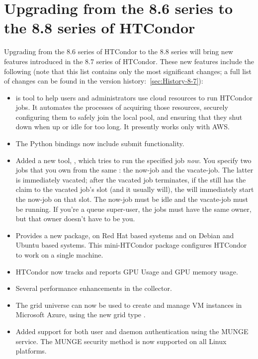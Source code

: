 \section{Upgrading from the 8.6 series to the 8.8 series of HTCondor}\label{sec:to-8.8}

Upgrading from the 8.6 series of HTCondor to the 8.8 series
will bring new features introduced in the 8.7 series of HTCondor.
These new features include the following (note that this list contains
only the most significant changes; a full list of changes can be
found in the version history:~\ref{sec:History-8-7}):

\begin{itemize}

\item {} is tool to help users and administrators use cloud
resources to run HTCondor jobs.
It automates the processes of acquiring those resources, securely configuring
them to safely join the local pool, and ensuring that they shut down when up or
idle for too long.
It presently works only with AWS.

\item The Python bindings now include submit functionality.

\item Added a new tool, , which tries to run the specified job
\emph{now}.  You specify two jobs that you own from the same : the
now-job and the vacate-job.  The latter is immediately vacated; after the
vacated job terminates, if the  still has the claim to the vacated job's
slot (and it usually will), the  will immediately start the now-job on
that slot.  The now-job must be idle and the vacate-job must be running.  If
you're a queue super-user, the jobs must have the same owner, but that owner
doesn't have to be you.

\item Provides a new package,  on Red Hat based systems and
 on Debian and Ubuntu based systems.
This mini-HTCondor package configures HTCondor to work on a single machine.

\item HTCondor now tracks and reports GPU Usage and GPU memory usage.

\item Several performance enhancements in the collector.

\item The grid universe can now be used to create and manage VM instances
in Microsoft Azure, using the new grid type .

\item Added support for both user and daemon authentication using the MUNGE service.
The MUNGE security method is now supported on all Linux platforms.

\end{itemize}

